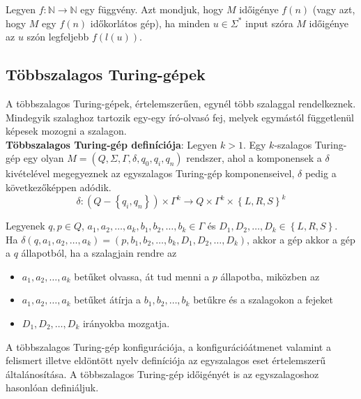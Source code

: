 \documentclass[tikz,12pt,margin=0px]{article}
\begin{document}
    \noindent Legyen $f : \mathbb{N} \to \mathbb{N}$ egy függvény. Azt mondjuk, hogy $M$ időigénye $f(n)$ (vagy azt, hogy $M$ egy $f(n)$ időkorlátos gép), ha minden $u \in \Sigma^{*}$ input szóra $M$ időigénye az $u$ szón legfeljebb $f(l(u))$.

	\subsection*{Többszalagos Turing-gépek}
	
	A többszalagos Turing-gépek, értelemszerűen, egynél több szalaggal rendelkeznek.
	Mindegyik szalaghoz tartozik egy-egy író-olvasó fej, melyek egymástól
	függetlenül képesek mozogni a szalagon.\\
	
    \noindent \textbf{Többszalagos Turing-gép definíciója}: Legyen $k > 1$. Egy $k$-szalagos Turing-gép egy olyan $M = (Q, \Sigma, \Gamma, \delta, q_{0}, q_{i}, q_{n})$ rendszer, ahol a komponensek a $\delta$ kivételével megegyeznek az egyszalagos Turing-gép komponenseivel, $\delta$ pedig a következőképpen adódik.
	\[
        \delta : (Q - \left\{q_{i},q_{n}\right\}) \times \Gamma^{k} \to Q \times \Gamma^{k} \times \left\{L, R, S\right\}^{k}
    \]

    \noindent Legyenek $q, p \in Q$, $a_{1}, a_{2}, \ldots , a_{k}, b_{1}, b_{2}, \ldots, b_{k} \in \Gamma$ és $D_{1}, D_{2}, \ldots, D_{k} \in \left\{L, R, S\right\}$.\\

    \noindent Ha $\delta(q,a_{1}, a_{2}, \ldots , a_{k}) = (p,b_{1}, b_{2}, \ldots, b_{k}, D_{1}, D_{2}, \ldots, D_{k})$, akkor a gép akkor a gép a $q$ állapotból, ha a szalagjain rendre az
    \begin{itemize}
    	\item $a_{1}, a_{2}, \ldots , a_{k}$ betűket olvassa, át tud menni a $p$ állapotba, miközben az
    	\item $a_{1}, a_{2}, \ldots , a_{k}$ betűket átírja a $b_{1}, b_{2}, \ldots , b_{k}$ betűkre és a szalagokon a fejeket
    	\item $D_{1}, D_{2}, \ldots , D_{k}$ irányokba mozgatja.
    \end{itemize}
	
    \noindent A többszalagos Turing-gép konfigurációja, a konfigurációátmenet valamint a felismert illetve eldöntött nyelv definíciója az egyszalagos eset értelemszerű általánosítása. A többszalagos Turing-gép időigényét is az egyszalagoshoz hasonlóan definiáljuk.\\
	
\end{document}
